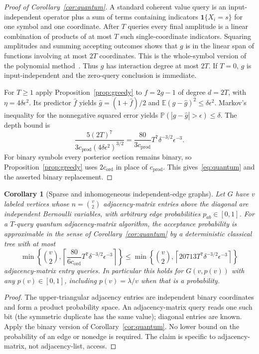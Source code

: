 \documentclass[11pt]{article}
\numberwithin{equation}{section}
\newtheorem{corollary}[theorem]{Corollary}
\theoremstyle{remark}
\newcommand{\E}{\mathbb E}
\newcommand{\Prb}{\mathbb P}
\newcommand{\one}{\mathbf 1}
\newcommand{\cprod}{c_{\mathrm{prod}}}
\newcommand{\cord}{c_{\mathrm{ord}}}
\begin{document}
\begin{proof}[Proof of Corollary~\ref{cor:quantum}]
A standard coherent value query is an input-independent operator plus a sum of terms containing indicators $\one\{X_i=s\}$ for one symbol and one coordinate. After $T$ queries every final amplitude is a linear combination of products of at most $T$ such single-coordinate indicators. Squaring amplitudes and summing accepting outcomes shows that $g$ is in the linear span of functions involving at most $2T$ coordinates. This is the whole-symbol version of the polynomial method~\cite{BBCMW01}. Thus $g$ has interaction degree at most $2T$. If $T=0$, $g$ is input-independent and the zero-query conclusion is immediate.

For $T\ge1$ apply Proposition~\ref{prop:greedy} to $f=2g-1$ of degree $d=2T$, with $\eta=4\delta\epsilon^2$. Its predictor $\widehat f$ yields $\widehat g=(1+\widehat f)/2$ and
$\E(g-\widehat g)^2\le\delta\epsilon^2$. Markov's inequality for the nonnegative squared error yields
$\Prb(|g-\widehat g|>\epsilon)\le\delta$. The depth bound is
\[
 \frac{5(2T)^7}{3\cprod(4\delta\epsilon^2)^{3/2}}
 =\frac{80}{3\cprod}T^7\delta^{-3/2}\epsilon^{-3}.
\]
For binary symbols every posterior section remains binary, so Proposition~\ref{prop:greedy} uses $2\cord$ in place of $\cprod$. This gives~\eqref{eq:quantum} and the asserted binary replacement.
\end{proof}

\begin{corollary}[Sparse and inhomogeneous independent-edge graphs]\label{cor:graphs}
Let $G$ have $v$ labeled vertices whose $n=\binom v2$ adjacency-matrix entries above the diagonal are independent Bernoulli variables, with arbitrary edge probabilities $p_{ab}\in[0,1]$. For a $T$-query quantum adjacency-matrix algorithm, the acceptance probability is approximable in the sense of Corollary~\ref{cor:quantum} by a deterministic classical tree with at most
\[
 \min\left\{\binom v2,\left\lceil\frac{80}{6\cord}T^7\delta^{-3/2}\epsilon^{-3}\right\rceil\right\}
 \le\min\left\{\binom v2,\left\lceil20713 T^7\delta^{-3/2}\epsilon^{-3}\right\rceil\right\}
\]
adjacency-matrix entry queries. In particular this holds for $G(v,p(v))$ with \emph{any} $p(v)\in[0,1]$, including $p(v)=\lambda/v$ when that is a probability.
\end{corollary}
\begin{proof}
The upper-triangular adjacency entries are independent binary coordinates and form a product probability space. An adjacency-matrix query reads one such bit (the symmetric duplicate has the same value); diagonal entries are known. Apply the binary version of Corollary~\ref{cor:quantum}. No lower bound on the probability of an edge or nonedge is required. The claim is specific to adjacency-matrix, not adjacency-list, access.
\end{proof}
\end{document}
